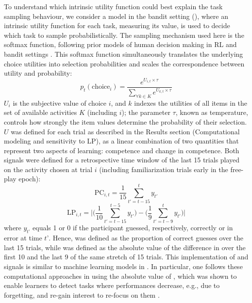     To understand which intrinsic utility function could best explain the task sampling behaviour, we consider a model in the bandit setting (\cite{linke2020adapting}), where an intrinsic utility function for each task, measuring its value, is used to decide which task to sample probabilistically. The sampling mechanism used here is the softmax function, following prior models of human decision making in RL and bandit settings \cite{nussenbaum2019reinforcement}. This softmax function simultaneously translates the underlying choice utilities into selection probabilities and scales the correspondence between utility and probability: 
    \begin{equation}\label{eq:softmax}
        p_t(\text{choice}_i) = \frac{e^{U_{i,t}\times\tau}}{\sum_{\forall k \in K}e^{U_{k,t}\times\tau}}
    \end{equation}
    $U_i$ is the subjective value of choice $i$, and $k$ indexes the utilities of all items in the set of available activities $K$ (including $i$); the parameter $\tau$, known as temperature, controls how strongly the item values determine the probability of their selection. $U$ was defined for each trial as described in the Results section (Computational modeling and sensitivity to LP), as a linear combination of two quantities that represent two aspects of learning: competence and change in competence. Both signals were defined for a retrospective time window of the last 15 trials played on the activity chosen at trial $i$  (including familiarization trials early in the free-play epoch): 
    \begin{equation}\label{eq:pc}
        \text{PC}_{i,t} = \frac{1}{15}\sum_{t'=t-15}^{t} y_{t'}
    \end{equation}
    \begin{equation}\label{eq:lp}
        \text{LP}_{i,t} = \bigg|\Big(\frac{1}{10}\sum_{t'=t-15}^{t-5} y_{t'}\Big) - \Big(\frac{1}{9}\sum_{t'=t-9}^{t} y_{t'}\Big)\bigg|
    \end{equation}
    where $y_{t’}$ equals 1 or 0 if the participant guessed, respectively, correctly or in error at time $t’$. Hence, {\PC} was defined as the proportion of correct guesses over the last 15 trials, while {\LP} was defined as the absolute value of the difference in {\PC} over the first 10 and the last 9 of the same stretch of 15 trials. This implementation of  {\PC} and {\LP} signals is similar to machine learning models in \cite{oudeyer2007intrinsic,colas2019curious,linke2020adapting}. In particular, one follows these computational approaches in using the absolute value of {\LP}, which was shown to enable learners to detect tasks where performances decrease, e.g., due to forgetting, and re-gain interest to re-focus on them \cite{colas2019curious}.
     
